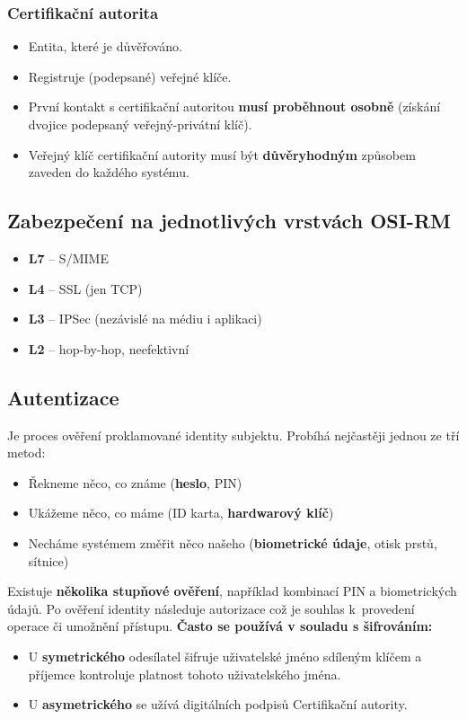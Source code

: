 \subsubsection*{Certifikační autorita}
\begin{itemize}
	\item Entita, které je důvěřováno.
	\item Registruje (podepsané) veřejné klíče.
	\item První kontakt s certifikační autoritou \textbf{musí proběhnout osobně }(získání dvojice podepsaný veřejný-privátní klíč).
	\item Veřejný klíč certifikační autority musí být \textbf{důvěryhodným} způsobem zaveden do každého systému.
\end{itemize}

\subsection*{Zabezpečení na jednotlivých vrstvách OSI-RM }
\begin{itemize}
	\item \textbf{L7} – S/MIME 
	\item \textbf{L4} – SSL (jen TCP) 
	\item \textbf{L3} – IPSec (nezávislé na médiu i aplikaci)
	\item \textbf{L2} – hop-by-hop, neefektivní
\end{itemize}




\subsection*{Autentizace}
Je proces ověření proklamované identity subjektu. Probíhá nejčastěji jednou ze tří metod:
\begin{itemize}
	\item Řekneme něco, co známe (\textbf{heslo}, PIN)
	\item Ukážeme něco, co máme (ID karta, \textbf{hardwarový klíč})
	\item Necháme systémem změřit něco našeho (\textbf{biometrické údaje}, otisk prstů, sítnice)
\end{itemize}
Existuje \textbf{několika stupňové ověření}, například kombinací PIN a biometrických údajů. Po ověření identity následuje autorizace což je souhlas k provedení operace či umožnění přístupu. \textbf{Často se používá v souladu s šifrováním:}
\begin{itemize}
	\item U \textbf{symetrického} odesílatel šifruje uživatelské jméno sdíleným klíčem a příjemce kontroluje platnost tohoto uživatelského jména.
	\item U \textbf{asymetrického} se užívá digitálních podpisů Certifikační autority.
\end{itemize}


